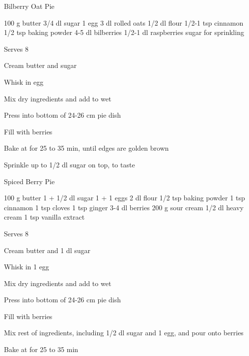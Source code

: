 \begin{denserecipe}{Bilberry Oat Pie}{}
\begin{ingredients}
100 g butter
3/4 dl sugar
1 egg
3 dl rolled oats
1/2 dl flour
1/2-1 tsp cinnamon
1/2 tsp baking powder
4-5 dl bilberries
1/2-1 dl raspberries
sugar for sprinkling
\end{ingredients}
\nextcolumn
Serves 8
\begin{steps}
    \item Cream butter and sugar
    \item Whisk in egg
    \item Mix dry ingredients and add to wet
    \item Press into bottom of 24-26 cm pie dish
    \item Fill with berries
    \item Bake at  for 25 to 35 min, until edges are golden brown
    \item Sprinkle up to 1/2 dl sugar on top, to taste
\end{steps}
\end{denserecipe}

\begin{denserecipe}{Spiced Berry Pie}{}
\begin{ingredients}
100 g butter
1 + 1/2 dl sugar
1 + 1 eggs
2 dl flour
1/2 tsp baking powder
1 tsp cinnamon
1 tsp cloves
1 tsp ginger
3-4 dl berries
200 g sour cream
1/2 dl heavy cream
1 tsp vanilla extract
\end{ingredients}
\nextcolumn
Serves 8
\begin{steps}
    \item Cream butter and 1 dl sugar
    \item Whisk in 1 egg
    \item Mix dry ingredients and add to wet
    \item Press into bottom of 24-26 cm pie dish
    \item Fill with berries
    \item Mix rest of ingredients, including 1/2 dl sugar and 1 egg, and pour onto berries
    \item Bake at  for 25 to 35 min
\end{steps}
\end{denserecipe}

